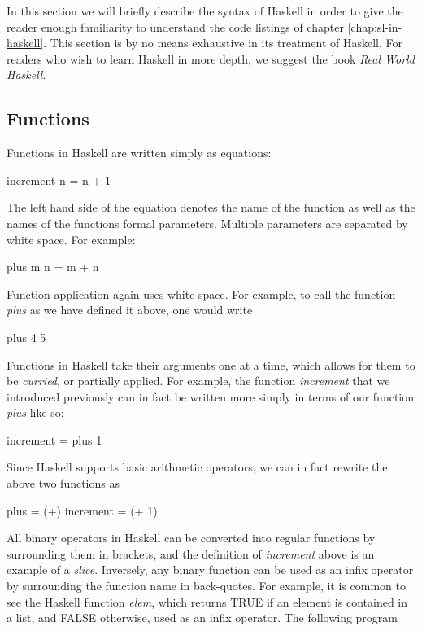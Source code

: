 \documentclass[thesis.tex]{subfiles}
\begin{document}
In this section we will briefly describe the syntax of Haskell in
order to give the reader enough familiarity to understand the code
listings of chapter \ref{chap:sl-in-haskell}. This section is by no
means exhaustive in its treatment of Haskell. For readers who wish to
learn Haskell in more depth, we suggest the book \emph{Real World
  Haskell}.

\subsection{Functions}

Functions in Haskell are written simply as equations:

\begin{spec}
increment n = n + 1
\end{spec}

The left hand side of the equation denotes the name of the function as well as the names of the
functions formal parameters. Multiple parameters are separated by white space. For example:

\begin{spec}
plus m n = m + n
\end{spec}

Function application again uses white space. For example, to call the function \emph{plus} as we have
defined it above, one would write

\begin{spec}
plus 4 5
\end{spec}

Functions in Haskell take their arguments one at a time, which allows for them to be \emph{curried}, or
partially applied. For example, the function \emph{increment} that we introduced previously can in fact
be written more simply in terms of our function \emph{plus} like so:

\begin{spec}
increment = plus 1
\end{spec}

Since Haskell supports basic arithmetic operators, we can in fact rewrite the above two functions as

\begin{spec}
plus = (+)
increment = (+ 1)
\end{spec}

All binary operators in Haskell can be converted into regular functions by surrounding them in brackets,
and the definition of \emph{increment} above is an example of a \emph{slice}. Inversely, any binary function
can be used as an infix operator by surrounding the function name in back-quotes. For example, it is
common to see the Haskell function \emph{elem}, which returns TRUE if an element is contained in a list, and
FALSE otherwise, used as an infix operator. The following program
\end{document}
